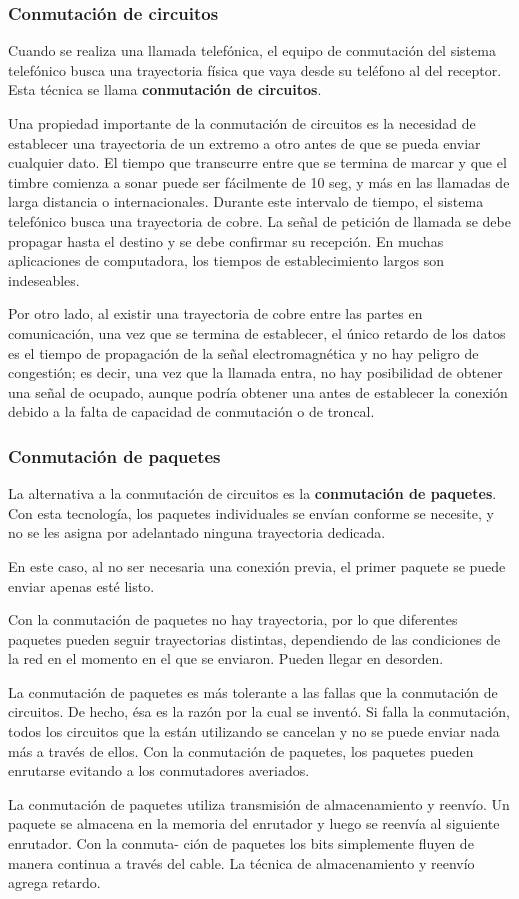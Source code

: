 \subsubsection*{Conmutación de circuitos}
Cuando se realiza una llamada telefónica, el equipo de conmutación del sistema telefónico busca una trayectoria física que vaya desde su teléfono al del receptor. Esta técnica se llama \textbf{conmutación de circuitos}.

Una propiedad importante de la conmutación de circuitos es la necesidad de establecer una trayectoria de un extremo a otro antes de que se pueda enviar cualquier dato. El tiempo que transcurre entre que se termina de marcar y que el timbre comienza a sonar puede ser fácilmente de 10 seg, y más en las llamadas de larga distancia o internacionales. Durante este intervalo de tiempo, el sistema telefónico busca una trayectoria de cobre. La señal de petición de llamada se debe propagar hasta el destino y se debe confirmar su recepción. En muchas aplicaciones de computadora, los tiempos de establecimiento largos son indeseables.

Por otro lado, al existir una trayectoria de cobre entre las partes en comunicación, una vez que se termina de establecer, el único retardo de los datos es el tiempo de propagación de la señal electromagnética y no
hay peligro de congestión; es decir, una vez que la llamada entra, no hay posibilidad de obtener una señal de ocupado, aunque podría obtener una antes de establecer la conexión debido a la falta de capacidad de conmutación o de troncal.

\subsubsection*{Conmutación de paquetes}
La alternativa a la conmutación de circuitos es la \textbf{conmutación de paquetes}. Con esta tecnología, los paquetes individuales se envían conforme se necesite, y no se les asigna por adelantado ninguna trayectoria dedicada.

En este caso, al no ser necesaria una conexión previa, el primer paquete se puede enviar apenas esté listo. 

Con la conmutación de paquetes no
hay trayectoria, por lo que diferentes paquetes pueden seguir trayectorias distintas, dependiendo
de las condiciones de la red en el momento en el que se enviaron. Pueden llegar en desorden.

La conmutación de paquetes es más tolerante a las fallas que la conmutación de circuitos. De  hecho, ésa es la razón por la cual se inventó. Si falla la conmutación, todos los circuitos que la están utilizando se cancelan y no se puede enviar nada más a través de ellos. Con la conmutación de paquetes, los paquetes pueden enrutarse evitando a los conmutadores averiados.

La conmutación de paquetes utiliza transmisión de almacenamiento y reenvío. Un paquete se
almacena en la memoria del enrutador y luego se reenvía al siguiente enrutador. Con la conmuta-
ción de paquetes los bits simplemente fluyen de manera continua a través del cable. La técnica de
almacenamiento y reenvío agrega retardo.
